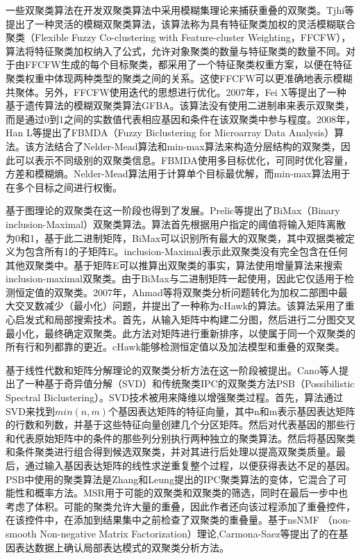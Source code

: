     一些双聚类算法在开发双聚类算法中采用模糊集理论来捕获重叠的双聚类。Tjhi\cite{tjhi2006flexible}等提出了一种灵活的模糊双聚类算法，该算法称为具有特征聚类加权的灵活模糊联合聚类（Flexible Fuzzy Co-clustering with Feature-cluster Weighting，FFCFW），算法将特征聚类加权纳入了公式，允许对象聚类的数量与特征聚类的数量不同。对于由FFCFW生成的每个目标聚类，都采用了一个特征聚类权重方案，以便在特征聚类权重中体现两种类型的聚类之间的关系。这使FFCFW可以更准确地表示模糊共聚体。另外，FFCFW使用迭代的思想进行优化。2007年，Fei X\cite{fei2007gfba}等提出了一种基于遗传算法的模糊双聚类算法GFBA。该算法没有使用二进制串来表示双聚类，而是通过0到1之间的实数值代表相应基因和条件在该双聚类中参与程度。2008年，Han L\cite{han2008fuzzy}等提出了FBMDA（Fuzzy Biclustering for Microarray Data Analysis）算法。该方法结合了Nelder-Mead算法和min-max算法来构造分层结构的双聚类，因此可以表示不同级别的双聚类信息。FBMDA使用多目标优化，可同时优化容量，方差和模糊熵。Nelder-Mead算法用于计算单个目标最优解，而min-max算法用于在多个目标之间进行权衡。

    基于图理论的双聚类在这一阶段也得到了发展。Prelic\cite{prelic2006systematic}等提出了BiMax（Binary inclusion-Maximal）双聚类算法。算法首先根据用户指定的阈值将输入矩阵离散为0和1，基于此二进制矩阵，BiMax可以识别所有最大的双聚类，其中双据类被定义为包含所有1的子矩阵E。inclusion-Maximal表示此双聚类没有完全包含在任何其他双聚类中。基于矩阵E可以推算出双聚类的事实，算法使用增量算法来搜索inclusion-maximal双聚类。由于BiMax与二进制矩阵一起使用，因此它仅适用于检测恒定值的双聚类。2007年，Ahmad\cite{ahmad2007chawk}等将双聚类分析问题转化为加权二部图中最大交叉数减少（最小化）问题，并提出了一种称为cHawk的算法。该算法采用了重心启发式和局部搜索技术。首先，从输入矩阵中构建二分图，然后进行二分图交叉最小化，最终确定双聚类。此方法对矩阵进行重新排序，以使属于同一个双聚类的所有行和列都靠的更近。cHawk能够检测恒定值以及加法模型和重叠的双聚类。

    基于线性代数和矩阵分解理论的双聚类分析方法在这一阶段被提出。Cano\cite{cano2007possibilistic}等人提出了一种基于奇异值分解（SVD）和传统聚类IPC的双聚类方法PSB（Possibilistic Spectral Biclustering）。SVD技术被用来降维以增强聚类过程。首先，算法通过SVD来找到$min(n, m)$个基因表达矩阵的特征向量，其中n和m表示基因表达矩阵的行数和列数，并基于这些特征向量创建几个分区矩阵。然后对代表基因的那些行和代表原始矩阵中的条件的那些列分别执行两种独立的聚类算法。然后将基因聚类和条件聚类进行组合得到候选双聚类，并对其进行后处理以提高双聚类质量。最后，通过输入基因表达矩阵的线性求逆重复整个过程，以便获得表达不足的基因。PSB中使用的聚类算法是Zhang和Leung\cite{ZhangImproved}提出的IPC聚类算法的变体，它混合了可能性和概率方法。MSR用于可能的双聚类和双聚类的筛选，同时在最后一步中也考虑了体积。可能的聚类允许大量的重叠，因此作者还向该过程添加了重叠控件，在该控件中，在添加到结果集中之前检查了双聚类的重叠量。基于nsNMF （non-smooth Non-negative Matrix Factorization）理论,Carmona-Saez\cite{carmona2006biclustering}等提出了的在基因表达数据上确认局部表达模式的双聚类分析方法。
    
